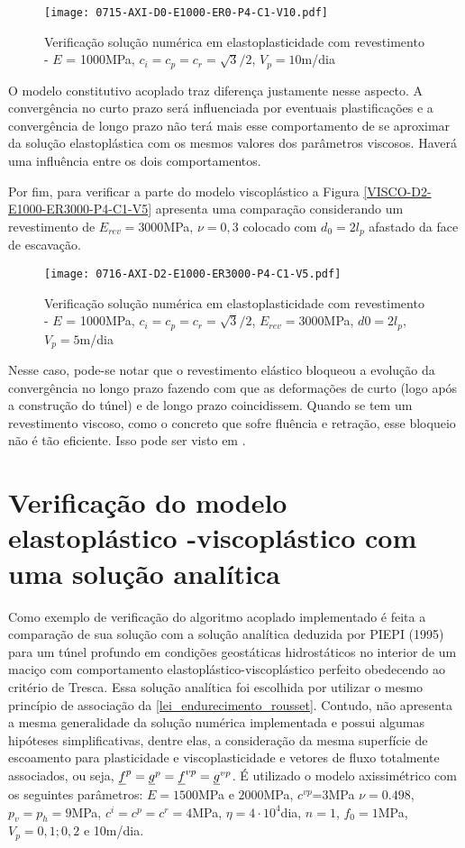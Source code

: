 \begin{figure}[H]
	\begin{center}
		\texttt{[image: 0715-AXI-D0-E1000-ER0-P4-C1-V10.pdf]}
	\end{center}
	\caption{\label{VISCO-D0-E1000-ER0-P4-C1-V10}Verificação solução numérica em elastoplasticidade com revestimento - $E$ = 1000MPa, $c_i=c_p=c_r=\sqrt{3}/2$, $V_p=10$m/dia}
\end{figure}
O modelo constitutivo acoplado traz diferença justamente nesse aspecto. A convergência no curto prazo será influenciada por eventuais plastificações e a convergência de longo prazo não terá mais esse comportamento de se aproximar da solução elastoplástica com os mesmos valores dos parâmetros viscosos. Haverá uma influência entre os dois comportamentos.

Por fim, para verificar a parte do modelo viscoplástico a Figura \autoref{VISCO-D2-E1000-ER3000-P4-C1-V5} apresenta uma comparação considerando um revestimento de $E_{rev}=3000$MPa, $\nu=0,3$ colocado com $d_0=2l_p$ afastado da face de escavação.

\begin{figure}[H]
	\begin{center}
		\texttt{[image: 0716-AXI-D2-E1000-ER3000-P4-C1-V5.pdf]}
	\end{center}
	\caption{\label{VISCO-D2-E1000-ER3000-P4-C1-V5}Verificação solução numérica em elastoplasticidade com revestimento - $E$ = 1000MPa, $c_i=c_p=c_r=\sqrt{3}/2$, $E_{rev} = 3000$MPa, $d0=2l_p$, $V_p=5$m/dia}
\end{figure}
Nesse caso, pode-se notar que o revestimento elástico bloqueou a evolução da convergência no longo prazo fazendo com que as deformações de curto (logo após a construção do túnel) e de longo prazo coincidissem. Quando se tem um revestimento viscoso, como o concreto que sofre fluência e retração, esse bloqueio não é tão eficiente. Isso pode ser visto em .


\section{Verificação do modelo elastoplástico -viscoplástico com uma solução analítica}

Como exemplo de verificação do algoritmo acoplado implementado é feita a comparação de sua solução com a solução analítica deduzida por PIEPI (1995) para um túnel profundo em condições geostáticas hidrostáticos no interior de um maciço com comportamento elastoplástico-viscoplástico perfeito obedecendo ao critério de Tresca. Essa solução analítica foi escolhida por utilizar o mesmo princípio de associação da \autoref{lei_endurecimento_rousset}. Contudo, não apresenta a mesma generalidade da solução numérica implementada e possui algumas hipóteses simplificativas, dentre elas, a consideração da mesma superfície de escoamento para plasticidade e viscoplasticidade e vetores de fluxo totalmente associados, ou seja, $\underline f^p = \underline{g}^{p} = \underline f^{vp} = \underline{g}^{vp}$. É utilizado o modelo axissimétrico com os seguintes parâmetros: $E=1500$MPa e $2000$MPa, $c^{vp}$=3MPa $\nu=0.498$, $p_v=p_h=9$MPa, $c^i=c^p=c^r =4$MPa, $\eta = 4 \cdot 10^4$dia, $n=1$, $f_0=1$MPa, $V_p=0,1; 0,2$ e 10m/dia. 

